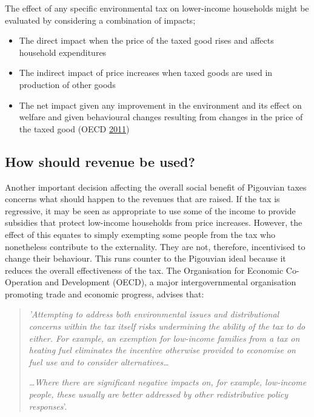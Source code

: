 \documentclass[]{tufte-handout}
\begin{document}
The effect of any specific environmental tax on lower-income households
might be evaluated by considering a combination of impacts;

\begin{itemize}
\item
  The direct impact when the price of the taxed good rises and affects
  household expenditures
\item
  The indirect impact of price increases when taxed goods are used in
  production of other goods
\item
  The net impact given any improvement in the environment and its effect
  on welfare and given behavioural changes resulting from changes in the
  price of the taxed good (OECD \protect\hyperlink{ref-OECD2011}{2011})
\end{itemize}

\hypertarget{how-should-revenue-be-used}{%
\subsection{How should revenue be
used?}\label{how-should-revenue-be-used}}

Another important decision affecting the overall social benefit of
Pigouvian taxes concerns what should happen to the revenues that are
raised. If the tax is regressive, it may be seen as appropriate to use
some of the income to provide subsidies that protect low-income
households from price increases. However, the effect of this equates to
simply exempting some people from the tax who nonetheless contribute to
the externality. They are not, therefore, incentivised to change their
behaviour. This runs counter to the Pigouvian ideal because it reduces
the overall effectiveness of the tax. The Organisation for Economic
Co-Operation and Development (OECD), a major intergovernmental
organisation promoting trade and economic progress, advises that:

\begin{quote}
\emph{'Attempting to address both environmental issues and
distributional concerns within the tax itself risks undermining the
ability of the tax to do either. For example, an exemption for
low-income families from a tax on heating fuel eliminates the incentive
otherwise provided to economise on fuel use and to consider
alternatives\ldots{}}

\emph{\ldots{}Where there are significant negative impacts on, for
example, low-income people, these usually are better addressed by other
redistributive policy responses}'.
\end{quote}
\end{document}
